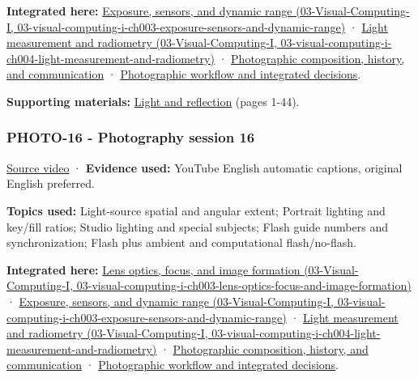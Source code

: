 \textbf{Integrated here:} \href{../03-Visual-Computing-I/main.pdf\#nameddest=03-visual-computing-i-ch003-exposure-sensors-and-dynamic-range}{Exposure, sensors, and dynamic range (03-Visual-Computing-I, 03-visual-computing-i-ch003-exposure-sensors-and-dynamic-range)} · \href{../03-Visual-Computing-I/main.pdf\#nameddest=03-visual-computing-i-ch004-light-measurement-and-radiometry}{Light measurement and radiometry (03-Visual-Computing-I, 03-visual-computing-i-ch004-light-measurement-and-radiometry)} · \hyperref[04-visual-computing-ii-ch034-photographic-composition-history-and-communication]{Photographic composition, history, and communication} · \hyperref[04-visual-computing-ii-ch034-photographic-workflow-and-integrated-decisions]{Photographic workflow and integrated decisions}.

\textbf{Supporting materials:} \href{https://drive.google.com/open?id=0B6w2XfPHEcZYNHdYdjhMakktS28}{Light and reflection} (pages 1-44).

\subsubsection{PHOTO-16 - Photography session 16}\label{04-visual-computing-ii-ch036-photo-16---photography-session-16}

\href{https://www.youtube.com/watch?v=gy-6WhxVIqc}{Source video} · \textbf{Evidence used:} YouTube English automatic captions, original English preferred.

\textbf{Topics used:} Light-source spatial and angular extent; Portrait lighting and key/fill ratios; Studio lighting and special subjects; Flash guide numbers and synchronization; Flash plus ambient and computational flash/no-flash.

\textbf{Integrated here:} \href{../03-Visual-Computing-I/main.pdf\#nameddest=03-visual-computing-i-ch003-lens-optics-focus-and-image-formation}{Lens optics, focus, and image formation (03-Visual-Computing-I, 03-visual-computing-i-ch003-lens-optics-focus-and-image-formation)} · \href{../03-Visual-Computing-I/main.pdf\#nameddest=03-visual-computing-i-ch003-exposure-sensors-and-dynamic-range}{Exposure, sensors, and dynamic range (03-Visual-Computing-I, 03-visual-computing-i-ch003-exposure-sensors-and-dynamic-range)} · \href{../03-Visual-Computing-I/main.pdf\#nameddest=03-visual-computing-i-ch004-light-measurement-and-radiometry}{Light measurement and radiometry (03-Visual-Computing-I, 03-visual-computing-i-ch004-light-measurement-and-radiometry)} · \hyperref[04-visual-computing-ii-ch034-photographic-composition-history-and-communication]{Photographic composition, history, and communication} · \hyperref[04-visual-computing-ii-ch034-photographic-workflow-and-integrated-decisions]{Photographic workflow and integrated decisions}.

